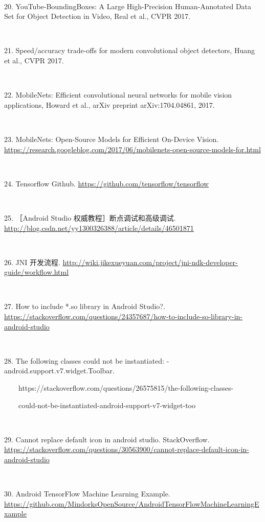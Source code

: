\documentclass[UTF8, Microsoft YaHei]{book}
\begin{document}
    ~

    20. YouTube-BoundingBoxes: A Large High-Precision Human-Annotated Data Set for Object Detection in Video, Real et al., CVPR 2017.

    ~

    21. Speed/accuracy trade-offs for modern convolutional object detectors, Huang et al., CVPR 2017.

    ~

    22. MobileNets: Efficient convolutional neural networks for mobile vision applications, Howard et al., arXiv preprint arXiv:1704.04861, 2017.

    ~

    23. MobileNets: Open-Source Models for Efficient On-Device Vision. \url{https://research.googleblog.com/2017/06/mobilenets-open-source-models-for.html}

    ~

    24. Tensorflow Github. \url{https://github.com/tensorflow/tensorflow}

    ~

    25. ［Android Studio 权威教程］断点调试和高级调试.   \url{http://blog.csdn.net/yy1300326388/article/details/46501871}

    ~

    26. JNI 开发流程.    \url{http://wiki.jikexueyuan.com/project/jni-ndk-developer-guide/workflow.html}

    ~

    27. How to include *.so library in Android Studio?.   \url{https://stackoverflow.com/questions/24357687/how-to-include-so-library-in-android-studio}

    ~

    28. The following classes could not be instantiated: - android.support.v7.widget.Toolbar.

    \ \ \ \ https://stackoverflow.com/questions/26575815/the-following-classes-

    \ \ \ \ could-not-be-instantiated-android-support-v7-widget-too

    ~

    29. Cannot replace default icon in android studio. StackOverflow.   \url{https://stackoverflow.com/questions/30563900/cannot-replace-default-icon-in-android-studio}

    ~

    30. Android TensorFlow Machine Learning Example.  \url{https://github.com/MindorksOpenSource/AndroidTensorFlowMachineLearningExample}

    ~
\end{document}
